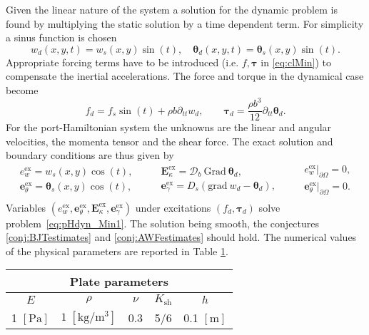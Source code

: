 Given the linear nature of the system a solution for the dynamic problem is found by multiplying the static solution by a time dependent term. For simplicity a sinus function is chosen
\[
w_d(x,y,t) = w_s(x,y) \sin(t), \quad \bm{\theta}_d(x,y,t) = \bm\theta_s(x,y) \sin(t).
\]
Appropriate forcing terms have to be introduced (i.e. $f, \bm{\tau}$ in \eqref{eq:clMin}) to compensate the inertial accelerations. The force and torque in the dynamical case become
\begin{equation*}
f_d = f_s \sin(t) + \rho b \partial_{tt} w_d, \qquad \bm{\tau}_d = \frac{\rho b^3}{12} \partial_{tt} \bm{\theta}_d.
\end{equation*}
For the port-Hamiltonian system the unknowns are the linear and angular velocities, the momenta tensor and the shear force. The exact solution and boundary conditions are thus given by
\begin{equation}
\begin{aligned}
e_w^\text{ex} = w_s(x,y) \cos(t), \\
\bm{e}_\theta^\text{ex} = \bm\theta_s(x,y) \cos(t), \\
\end{aligned} \qquad
\begin{aligned}
\bm{E}_\kappa^\text{ex} =  \bm{\mathcal{D}}_b \ \mathrm{Grad} \ \bm{\theta}_d, \\
\bm{e}_\gamma^\text{ex} = D_s(\mathrm{grad} \ w_d - \bm{\theta}_d), \\
\end{aligned}
\qquad
\begin{aligned}
e_w^\text{ex}\vert_{\partial\Omega} = 0, \\
\bm{e}_\theta^\text{ex}\vert_{\partial\Omega} = 0. \\
\end{aligned}
\end{equation}
Variables $(e_w^\text{ex}, \bm{e}_\theta^\text{ex}, \bm{E}_\kappa^\text{ex}, \bm{e}_\gamma^\text{ex})$ under excitations $(f_d, \bm{\tau}_d)$ solve problem~\eqref{eq:pHdyn_Min1}. The solution being smooth, the conjectures \ref{conj:BJTestimates} and \ref{conj:AWFestimates} should hold. The numerical values of the physical parameters are reported in Table \ref{tab:parMin}.  

\begin{table}[h]
	\centering
	\begin{tabular}{ccccc}
		\hline 
		\multicolumn{5}{c}{Plate parameters} \\ 
		\hline 
		$E$ & $\rho$ & $\nu$ & $K_{\text{sh}}$ & $h$ \\
		1 $[\textrm{Pa}]$ & $1\; [\textrm{kg}/\textrm{m}^3]$ & 0.3 & 5/6 & 0.1 $[\textrm{m}]$\\ 
		\hline 
	\end{tabular} 
	\captionsetup{width=0.95\linewidth}
	\vspace{1mm}
	\label{tab:parMin}
\end{table}

